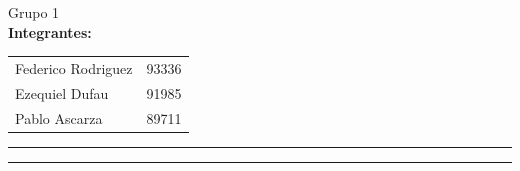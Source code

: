 \documentclass[11pt,a4paper]{article}
\begin{document}
\begin{titlepage}
	\begin{table}[H]
		\begin{flushleft}
		{\Large Grupo 1}\\
		\vspace{0.01\textheight}
		\textbf{Integrantes:}\\
		\vspace{0.01\textheight}
		\begin{tabular}{l r}
			Federico Rodriguez  & 93336\\
			Ezequiel Dufau & 91985\\
			Pablo Ascarza & 89711\\
		\end{tabular}
		\end{flushleft}
	\end{table}
	
	\vspace{0.05\textheight}
	\vspace{2pt}
	\vfill
	\rule{\textwidth}{1pt}\par %
	\vspace{2pt}\vspace{-\baselineskip} %
	\rule{\textwidth}{0.4pt}\par %
	
\end{titlepage}

\tableofcontents
\newpage
\end{document}
